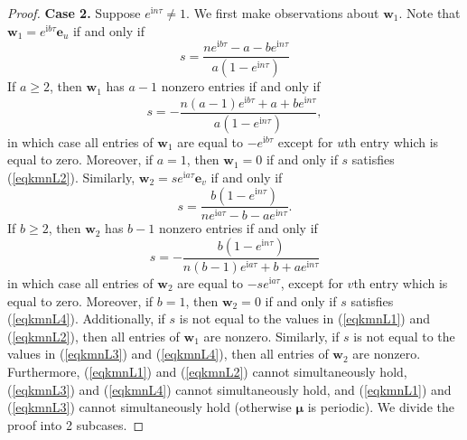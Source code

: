 \documentclass{article}
\numberwithin{equation}{section}
\newcommand{\be}{\mathbf e}
\newcommand{\bw}{\mathbf w}
\newcommand{\bmu}{{\boldsymbol{\mu}}}
\def\ii{\mathrm{i}}
\begin{document}
{\begin{proof}
\noindent \textbf{Case 2.} Suppose $e^{\ii n \tau}\neq 1$. We first make observations about $\bw_1$. Note that $\bw_1=e^{\ii b \tau}\be_u$ if and only if
\begin{equation}
\label{eqkmnL1}
s=\frac{ne^{\ii b \tau}-a-be^{\ii n \tau}}{a(1-e^{\ii n \tau})}
\end{equation}
If $a\geq 2$, then $\bw_1$ has $a-1$ nonzero entries if and only if
\begin{equation}
\label{eqkmnL2}
s=-\frac{n(a-1)e^{\ii b \tau}+a+be^{\ii n \tau}}{a(1-e^{\ii n \tau})},
\end{equation}
in which case all entries of $\bw_1$ are equal to $-e^{\ii b \tau}$ 
except for $u$th entry which is equal to zero. Moreover, if $a=1$, then $\bw_1=0$ if and only if $s$ satisfies (\ref{eqkmnL2}).
Similarly, $\bw_2=se^{\ii a \tau}\be_v$ if and only if
\begin{equation}
\label{eqkmnL3}
s=\frac{b(1-e^{\ii n \tau})}{ne^{\ii a \tau}-b-ae^{\ii n \tau}}.
\end{equation}
If $b\geq 2$, then $\bw_2$ has $b-1$ nonzero entries if and only if
\begin{equation}
\label{eqkmnL4}
s=-\frac{b(1-e^{\ii n \tau})}{n(b-1)e^{\ii a \tau}+b+ae^{\ii n \tau}}
\end{equation}
in which case all entries of $\bw_2$ are equal to $-se^{\ii a \tau}$, except for $v$th entry which is equal to zero. Moreover, if $b=1$, then $\bw_2=0$ if and only if $s$ satisfies (\ref{eqkmnL4}).
Additionally, if $s$ is not equal to the values in (\ref{eqkmnL1}) and (\ref{eqkmnL2}), then all entries of $\bw_1$ are nonzero. Similarly, if $s$ is not equal to the values in (\ref{eqkmnL3}) and (\ref{eqkmnL4}), then all entries of $\bw_2$ are nonzero. Furthermore, (\ref{eqkmnL1}) and (\ref{eqkmnL2}) cannot simultaneously hold, (\ref{eqkmnL3}) and (\ref{eqkmnL4}) cannot simultaneously hold, and (\ref{eqkmnL1}) and (\ref{eqkmnL3}) cannot simultaneously hold (otherwise $\bmu$ is periodic). %
We divide the proof into 2 subcases.


\end{proof}}
\end{document}
